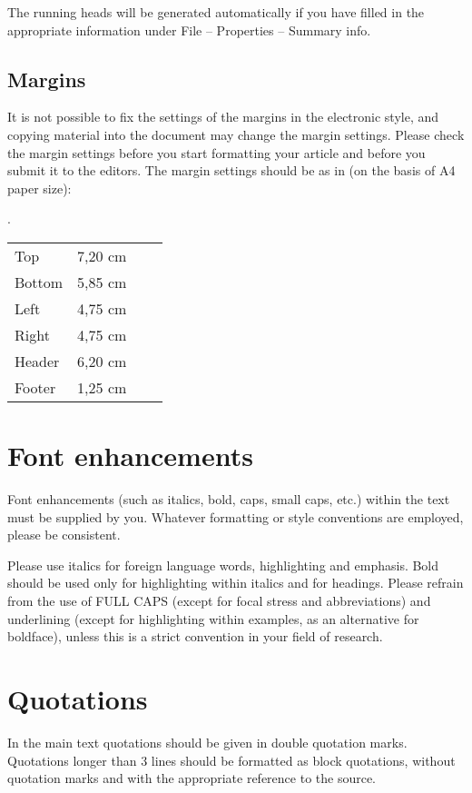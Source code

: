\documentclass[times,linguex]{lsb}
\begin{document}
The running heads will be generated automatically if you have filled in the appropriate information under File – Properties – Summary info.


\subsection{Margins}

It is not possible to fix the settings of the margins in the electronic style, and copying material into the document may change the margin settings. Please check the margin settings before you start formatting your article and before you submit it to the editors. The margin settings should be as in \Next  (on the basis of A4 paper size):

\ex. \begin{tabular}[t]{llll@{\hskip 36pt}}
Top 	&	7,20 cm\\
Bottom &	5,85 cm\\
Left 	&	4,75 cm\\
Right &		4,75 cm\\
Header &	6,20 cm\\
Footer 	&	1,25 cm\\
\end{tabular}


\section{Font enhancements}

Font enhancements (such as italics, bold, caps, small caps, etc.) within the text must be supplied by you. Whatever formatting or style conventions are employed, please be consistent.

Please use italics for foreign language words, highlighting and emphasis. Bold should be used only for highlighting within italics and for headings. Please refrain from the use of FULL CAPS (except for focal stress and abbreviations) and underlining (except for highlighting within examples, as an alternative for boldface), unless this is a strict convention in your field of research.


\section{Quotations}

In the main text quotations should be given in double quotation marks. Quotations longer than 3 lines should be formatted as block quotations, without quotation marks and with the appropriate reference to the source.
\end{document}
